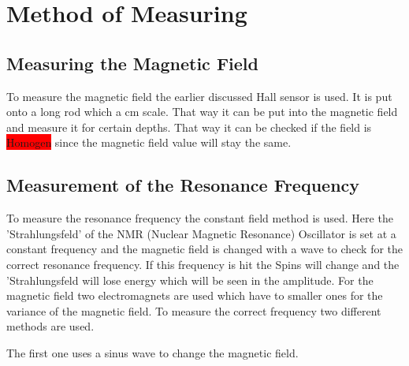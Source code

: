 \section{Method of Measuring}
\subsection{Measuring the Magnetic Field}
To measure the magnetic field the earlier discussed Hall sensor is used. It is put onto a long rod which a cm scale. That way it can be put into the magnetic field and measure it for certain depths. That way it can be checked if the field is \colorbox{red}{Homogen} since the magnetic field value will stay the same.
\subsection{Measurement of the Resonance Frequency}
To measure the resonance frequency the constant field method is used. Here the 'Strahlungsfeld' of the NMR (Nuclear Magnetic Resonance) Oscillator is set at a constant frequency and the magnetic field is changed with a wave to check for the correct resonance frequency. If this frequency is hit the Spins will change and the 'Strahlungsfeld will lose energy which will be seen in the amplitude. For the magnetic field two electromagnets are used which have to smaller ones for the variance of the magnetic field. To measure the correct frequency two different methods are used.\par
The first one uses a sinus wave to change the magnetic field. 